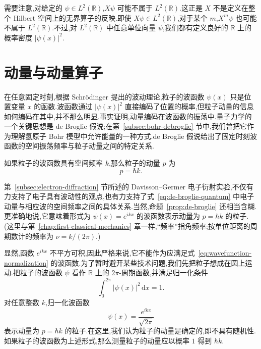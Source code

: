 需要注意,对给定的 \(\psi\in L^{2}(\mathbb{R})\),\(X\psi\) 可能不属于 \(L^{2}(\mathbb{R})\).这正是 \(X\) 不是定义在整个 Hilbert 空间上的无界算子的反映.即使 \(X\psi\in L^{2}(\mathbb{R})\),对于某个 \(m\),\(X^{m}\psi\) 也可能不属于 \(L^{2}(\mathbb{R})\).不过,对 \(L^{2}(\mathbb{R})\) 中任意单位向量 \(\psi\),我们都有定义良好的 \(\mathbb{R}\) 上的概率密度 \(|\psi(x)|^{2}\).

\section{动量与动量算子}\label{sec:momentum-operator}

在任意固定时刻,根据 Schrödinger 提出的波动理论,粒子的波函数 \(\psi(x)\) 只是位置变量 \(x\) 的函数.波函数通过 \(|\psi(x)|^{2}\) 直接编码了位置的概率,但粒子动量的信息如何编码在其中,并不那么明显.事实证明,动量编码在波函数的振荡中.量子力学的一个关键思想是 de Broglie 假说;在第~\ref{subsec:bohr-debroglie} 节中,我们曾把它作为理解氢原子 Bohr 模型中允许能量的一种方式.de Broglie 假说给出了固定时刻波函数的空间振荡频率与粒子动量之间的特定关系.

\begin{proposition}[de Broglie 假说]\label{prop:de-broglie}
如果粒子的波函数具有空间频率 \(k\),那么粒子的动量 \(p\) 为
\begin{equation}
p=\hbar k.
\label{eq:de-broglie-quantum}
\end{equation}
\end{proposition}

第~\ref{subsec:electron-diffraction} 节所述的 Davisson--Germer 电子衍射实验,不仅有力支持了电子具有波动性的观点,也有力支持了式~\eqref{eq:de-broglie-quantum} 中电子动量与相应波的空间频率之间的具体关系.当然,命题~\ref{prop:de-broglie} 还相当含糊.更准确地说,它意味着形式为 \(\psi(x)=e^{ikx}\) 的波函数表示动量为 \(p=\hbar k\) 的粒子.(这里与第~\ref{chap:first-classical-mechanics} 章一样,“频率”指角频率;按单位距离的周期数计的频率为 \(\nu=k/(2\pi)\).)

显然,函数 \(e^{ikx}\) 不平方可积,因此严格来说,它不能作为应满足式~\eqref{eq:wavefunction-normalization} 的波函数.为了暂时避开某些技术问题,我们先把粒子想成在圆上运动.把粒子的波函数 \(\psi\) 看作 \(\mathbb{R}\) 上的 \(2\pi\)-周期函数,并满足归一化条件
\[
\int_{0}^{2\pi}|\psi(x)|^{2}\,\mathrm{d}x=1.
\]
对任意整数 \(k\),归一化波函数
\[
\psi(x)=\frac{e^{ikx}}{\sqrt{2\pi}}
\]
表示动量为 \(p=\hbar k\) 的粒子.在这里,我们认为粒子的动量是确定的,即不具有随机性.如果粒子的波函数为上述形式,那么测量粒子的动量应以概率 \(1\) 得到 \(\hbar k\).

